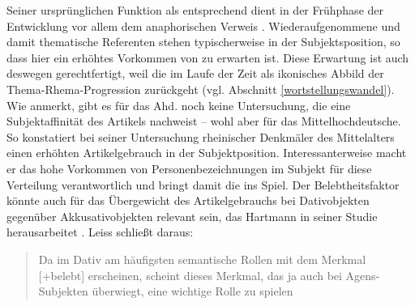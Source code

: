 Seiner ursprünglichen Funktion als  entsprechend dient  in der Frühphase der Entwicklung vor allem dem anaphorischen  Verweis \parencite[s. u.a.][]{Jager1917,Oubouzar1992,Leiss2000}. Wiederaufgenommene und damit thematische Referenten  stehen typischerweise in der  Subjektsposition, so dass hier ein erhöhtes Vorkommen von  zu erwarten ist. Diese Erwartung ist auch deswegen gerechtfertigt, weil die  im Laufe der Zeit als ikonisches Abbild der Thema-Rhema-Progression  zurückgeht (vgl. Abschnitt \ref{wortstellungswandel}). Wie  \textcite[165]{Leiss2000} anmerkt, gibt es für das Ahd. noch keine Untersuchung, die eine Subjektaffinität des Artikels nachweist -- wohl aber für das Mittelhochdeutsche. So konstatiert \textcite[33--35]{Hartmann1967} bei seiner Untersuchung rheinischer Denkmäler des Mittelalters einen erhöhten Artikelgebrauch in der  Subjektposition. Interessanterweise macht er das hohe Vorkommen von Personenbezeichnungen im Subjekt für diese Verteilung verantwortlich und bringt damit die  ins Spiel. Der Belebtheitsfaktor könnte auch für das Übergewicht des Artikelgebrauchs bei Dativobjekten  gegenüber Akkusativobjekten relevant sein, das Hartmann in seiner Studie herausarbeitet \parencite[42--43]{Hartmann1967}. Leiss schließt daraus: \blockcquote[165]{Leiss2000}{Da im Dativ am häufigsten semantische Rollen  mit dem Merkmal [+belebt]  erscheinen,
scheint dieses Merkmal, das ja auch bei Agens-Subjekten überwiegt, eine wichtige Rolle zu spielen}. 

